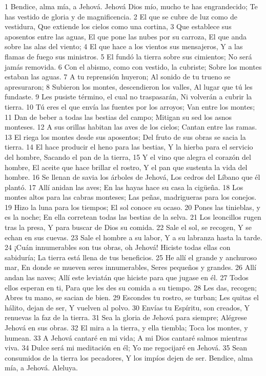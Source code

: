 1 Bendice, alma mía, a Jehová.
Jehová Dios mío, mucho te has engrandecido;
Te has vestido de gloria y de magnificencia.
2 El que se cubre de luz como de vestidura,
Que extiende los cielos como una cortina,
3 Que establece sus aposentos entre las aguas,
El que pone las nubes por su carroza,
El que anda sobre las alas del viento;
4 El que hace a los vientos sus mensajeros,
Y a las flamas de fuego sus ministros.
5 El fundó la tierra sobre sus cimientos;
No será jamás removida.
6 Con el abismo, como con vestido, la cubriste;
Sobre los montes estaban las aguas.
7 A tu reprensión huyeron;
Al sonido de tu trueno se apresuraron;
8 Subieron los montes, descendieron los valles,
Al lugar que tú les fundaste.
9 Les pusiste término, el cual no traspasarán,
Ni volverán a cubrir la tierra.
10 Tú eres el que envía las fuentes por los arroyos;
Van entre los montes;
11 Dan de beber a todas las bestias del campo;
Mitigan su sed los asnos monteses.
12 A sus orillas habitan las aves de los cielos;
Cantan entre las ramas.
13 El riega los montes desde sus aposentos;
Del fruto de sus obras se sacia la tierra.
14 El hace producir el heno para las bestias,
Y la hierba para el servicio del hombre,
Sacando el pan de la tierra,
15 Y el vino que alegra el corazón del hombre,
El aceite que hace brillar el rostro,
Y el pan que sustenta la vida del hombre.
16 Se llenan de savia los árboles de Jehová,
Los cedros del Líbano que él plantó.
17 Allí anidan las aves;
En las hayas hace su casa la cigüeña.
18 Los montes altos para las cabras monteses;
Las peñas, madrigueras para los conejos.
19 Hizo la luna para los tiempos;
El sol conoce su ocaso.
20 Pones las tinieblas, y es la noche;
En ella corretean todas las bestias de la selva.
21 Los leoncillos rugen tras la presa,
Y para buscar de Dios su comida.
22 Sale el sol, se recogen,
Y se echan en sus cuevas.
23 Sale el hombre a su labor,
Y a su labranza hasta la tarde.
24 ¡Cuán innumerables son tus obras, oh Jehová!
Hiciste todas ellas con sabiduría;
La tierra está llena de tus beneficios.
25 He allí el grande y anchuroso mar,
En donde se mueven seres innumerables,
Seres pequeños y grandes.
26 Allí andan las naves;
Allí este leviatán que hiciste para que jugase en él.
27 Todos ellos esperan en ti,
Para que les des su comida a su tiempo.
28 Les das, recogen;
Abres tu mano, se sacian de bien.
29 Escondes tu rostro, se turban;
Les quitas el hálito, dejan de ser,
Y vuelven al polvo.
30 Envías tu Espíritu, son creados,
Y renuevas la faz de la tierra.
31 Sea la gloria de Jehová para siempre;
Alégrese Jehová en sus obras.
32 El mira a la tierra, y ella tiembla;
Toca los montes, y humean.
33 A Jehová cantaré en mi vida;
A mi Dios cantaré salmos mientras viva.
34 Dulce será mi meditación en él;
Yo me regocijaré en Jehová.
35 Sean consumidos de la tierra los pecadores,
Y los impíos dejen de ser.
Bendice, alma mía, a Jehová.
Aleluya.


